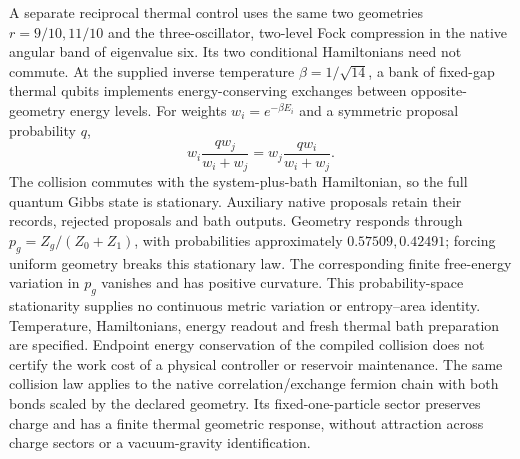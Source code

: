 A separate reciprocal thermal control uses the same two geometries
\(r=9/10,11/10\) and the three-oscillator, two-level Fock compression in
the native angular band of eigenvalue six. Its two conditional Hamiltonians
need not commute. At the supplied inverse temperature \(\beta=1/\sqrt{14}\),
a bank of fixed-gap thermal qubits implements energy-conserving exchanges
between opposite-geometry energy levels. For weights
\(w_i=e^{-\beta E_i}\) and a symmetric proposal probability \(q\),
\[
 w_i\frac{q w_j}{w_i+w_j}
 =w_j\frac{q w_i}{w_i+w_j}.
\]
The collision commutes with the system-plus-bath Hamiltonian, so the full
quantum Gibbs state is stationary. Auxiliary native proposals retain their
records, rejected proposals and bath outputs. Geometry responds through
\(p_g=Z_g/(Z_0+Z_1)\), with probabilities approximately
\(0.57509,0.42491\); forcing uniform geometry breaks this stationary law.
The corresponding finite free-energy variation in \(p_g\) vanishes and
has positive curvature. This probability-space stationarity supplies no
continuous metric variation or entropy--area identity. Temperature,
Hamiltonians, energy readout and fresh thermal bath preparation are
specified. Endpoint energy conservation of the compiled collision does
not certify the work cost of a physical controller or reservoir maintenance.
The same collision law applies to the native correlation/exchange fermion
chain with both bonds scaled by the declared geometry. Its fixed-one-particle
sector preserves charge and has a finite thermal geometric response, without
attraction across charge sectors or a vacuum-gravity identification.


